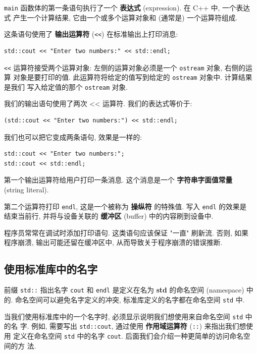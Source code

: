 \documentclass[lang=cn]{elegantbook}
\begin{document}
\texttt{main} 函数体的第一条语句执行了一个 \textbf{表达式} (expression). 在 C++ 中, 一个表达式
产生一个计算结果, 它由一个或多个运算对象和 (通常是) 一个运算符组成.

这条语句使用了 \textbf{输出运算符} (\texttt{<<}) 在标准输出上打印消息:

\begin{verbatim}
std::cout << "Enter two numbers:" << std::endl;
\end{verbatim}

\texttt{<<} 运算符接受两个运算对象: 左侧的运算对象必须是一个 \texttt{ostream} 对象, 右侧的运算
对象是要打印的值. 此运算符将给定的值写到给定的 \texttt{ostream} 对象中. 计算结果是我们
写入给定值的那个 \texttt{ostream} 对象.

我们的输出语句使用了两次 << 运算符. 我们的表达式等价于:

\begin{verbatim}
(std::cout << "Enter two numbers:") << std::endl;
\end{verbatim}

我们也可以把它变成两条语句, 效果是一样的:

\begin{verbatim}
std::cout << "Enter two numbers:";
std::cout << std::endl;
\end{verbatim}

第一个输出运算符给用户打印一条消息. 这个消息是一个 \textbf{字符串字面值常量} (string
literal).

第二个运算符打印 \texttt{endl}, 这是一个被称为 \textbf{操纵符} 的特殊值. 写入 \texttt{endl} 的效果是
结束当前行, 并将与设备关联的 \textbf{缓冲区} (buffer) 中的内容刷到设备中.

\vspace*{1\baselineskip}
\begin{note}
程序员常常在调试时添加打印语句. 这类语句应该保证 "一直" 刷新流. 否则, 如果程序崩溃, 输出可能还留在缓冲区中, 从而导致关于程序崩溃的错误推断.
\end{note}

\subsection{使用标准库中的名字}
\label{sec:orgd03c6d8}

前缀 \texttt{std::} 指出名字 \texttt{cout} 和 \texttt{endl} 是定义在名为 \textbf{std} 的命名空间 (namespace)
中的. 命名空间可以避免名字定义的冲突, 标准库定义的名字都在命名空间 \texttt{std} 中.

当我们使用标准库中的一个名字时, 必须显示说明我们想使用来自命名空间 \texttt{std} 中的名
字. 例如, 需要写出 \texttt{std::cout}, 通过使用 \textbf{作用域运算符} (\texttt{::}) 来指出我们想使用
定义在命名空间 \texttt{std} 中的名字 \texttt{cout}. 后面我们会介绍一种更简单的访问命名空间的方
法.
\end{document}
